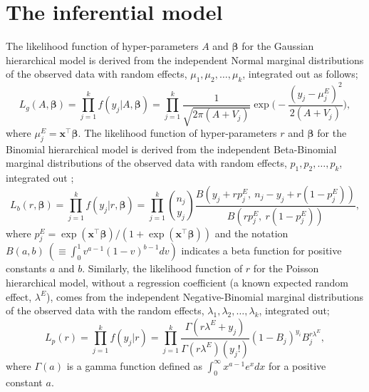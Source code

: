 \documentclass[article]{jss}
\begin{document}
\section[Inference]{The inferential model}\label{inference}

The likelihood function of hyper-parameters $A$ and $\boldsymbol{\beta}$ for the Gaussian hierarchical model is derived from the independent Normal marginal distributions of the observed data with random effects, $\mu_1, \mu_2, \ldots, \mu_k$, integrated out as follows; %
\begin{equation}\label{marginal_normal}
L_g(A, \boldsymbol{\boldsymbol{\beta}})=\prod_{j=1}^k f(y_j\vert A, \boldsymbol{\boldsymbol{\beta}})=\prod_{j=1}^k \frac{1}{\sqrt{2\pi (A+V_j)}}\exp\big(-\frac{(y_j-\mu^E_j)^2}{2(A+V_j)}\big),
\end{equation}
where $\mu^E_j=\boldsymbol{x}^\top\boldsymbol{\beta}$. The likelihood function of hyper-parameters $r$ and $\boldsymbol{\beta}$ for the Binomial hierarchical model is derived from the independent Beta-Binomial marginal distributions of the observed data with random effects, $p_1, p_2, \ldots, p_k$, integrated out \citep{skellam1948}; %
\begin{equation}\label{marginal_binomial}
L_b(r, \boldsymbol{\boldsymbol{\beta}})=\prod_{j=1}^k f(y_j\vert r, \boldsymbol{\boldsymbol{\beta}})=\prod_{j=1}^k\binom{n_j}{y_j}\frac{B(y_j+rp^E_j, ~n_j-y_j+r(1-p^E_j))}{B(rp^E_j, ~r(1-p^E_j))},
\end{equation}
where $p^E_j=\exp(\boldsymbol{x}^\top\boldsymbol{\beta})/(1+\exp(\boldsymbol{x}^\top\boldsymbol{\beta}))$ and the notation $B(a, b)~(\equiv\int_0^1 v^{a-1}(1-v)^{b-1}dv)$ indicates a beta function for positive constants $a$ and $b$. Similarly, the likelihood function of $r$ for the Poisson hierarchical model, without a regression coefficient (a known expected random effect, $\lambda^E$), comes from the independent Negative-Binomial marginal distributions of the observed data with the random effects, $\lambda_1, \lambda_2, \ldots, \lambda_k$, integrated out;
\begin{equation}\label{marginal_poisson}
L_p(r)=\prod_{j=1}^k f(y_j\vert r)=\prod^{k}_{j=1} \frac{\Gamma(r \lambda^E+y_j)}{\Gamma(r\lambda^E)(y_j!)}(1-B_{j})^{y_{i}}B_{j}^{r \lambda^E},
\end{equation}
where $\Gamma(a)$ is a gamma function defined as $\int_0^\infty x^{a-1}e^{x}dx$ for a positive constant $a$.
\end{document}

